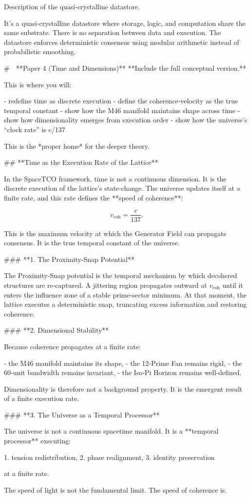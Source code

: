 
Description of the quasi-crystalline datastore.

It’s a quasi‑crystalline datastore where storage, logic, and computation share the same substrate.
There is no separation between data and execution.
The datastore enforces deterministic consensus using modular arithmetic instead of probabilistic smoothing.


# 📙 **Paper 4 (Time and Dimensions)**  
**Include the full conceptual version.**

This is where you will:

- redefine time as discrete execution  
- define the coherence‑velocity as the true temporal constant  
- show how the M46 manifold maintains shape across time  
- show how dimensionality emerges from execution order  
- show how the universe’s “clock rate” is c/137  

This is the *proper home* for the deeper theory.


## **Time as the Execution Rate of the Lattice**

In the SpaceTCO framework, time is not a continuous dimension. It is the discrete execution of the lattice’s state‑change. The universe updates itself at a finite rate, and this rate defines the **speed of coherence**:

\[
v_{\text{coh}} = \frac{c}{137}.
\]

This is the maximum velocity at which the Generator Field can propagate consensus. It is the true temporal constant of the universe.

### **1. The Proximity‑Snap Potential**

The Proximity‑Snap potential is the temporal mechanism by which decohered structures are re‑captured. A jittering region propagates outward at \(v_{\text{coh}}\) until it enters the influence zone of a stable prime‑sector minimum. At that moment, the lattice executes a deterministic snap, truncating excess information and restoring coherence.

### **2. Dimensional Stability**

Because coherence propagates at a finite rate:

- the M46 manifold maintains its shape,  
- the 12‑Prime Fan remains rigid,  
- the 60‑unit bandwidth remains invariant,  
- the Iso‑Pi Horizon remains well‑defined.

Dimensionality is therefore not a background property.  
It is the emergent result of a finite execution rate.

### **3. The Universe as a Temporal Processor**

The universe is not a continuous spacetime manifold.  
It is a **temporal processor** executing:

1. tension redistribution,  
2. phase realignment,  
3. identity preservation  

at a finite rate.

The speed of light is not the fundamental limit.  
The speed of coherence is.
